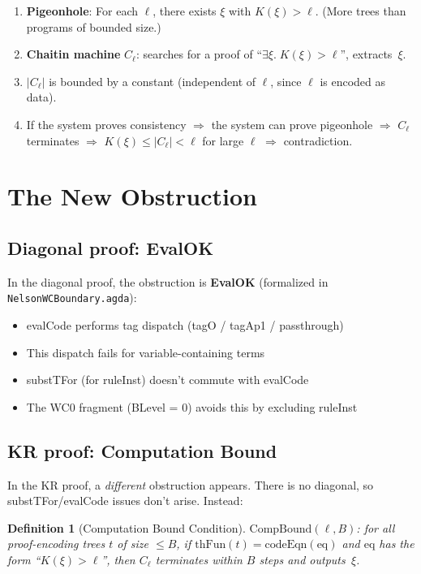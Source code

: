 \documentclass[11pt]{article}
\newtheorem{definition}[theorem]{Definition}
\begin{document}
\begin{enumerate}
\item \textbf{Pigeonhole}: For each $\ell$, there exists $\xi$ with $K(\xi) > \ell$.
  (More trees than programs of bounded size.)
\item \textbf{Chaitin machine} $C_\ell$: searches for a proof of ``$\exists \xi.\; K(\xi) > \ell$'', extracts~$\xi$.
\item $|C_\ell|$ is bounded by a constant (independent of $\ell$, since $\ell$ is encoded as data).
\item If the system proves consistency $\Rightarrow$ the system can prove pigeonhole $\Rightarrow$ $C_\ell$ terminates $\Rightarrow$ $K(\xi) \le |C_\ell| < \ell$ for large $\ell$ $\Rightarrow$ contradiction.
\end{enumerate}

\section{The New Obstruction}

\subsection{Diagonal proof: EvalOK}

In the diagonal proof, the obstruction is \textbf{EvalOK} (formalized in \texttt{NelsonWCBoundary.agda}):
\begin{itemize}
\item evalCode performs tag dispatch (tagO / tagAp1 / passthrough)
\item This dispatch fails for variable-containing terms
\item substTFor (for ruleInst) doesn't commute with evalCode
\item The WC0 fragment (BLevel = 0) avoids this by excluding ruleInst
\end{itemize}

\subsection{KR proof: Computation Bound}

In the KR proof, a \emph{different} obstruction appears. There is no diagonal, so substTFor/evalCode issues don't arise. Instead:

\begin{definition}[Computation Bound Condition]
$\mathrm{CompBound}(\ell, B)$: for all proof-encoding trees $t$ of size $\le B$, if $\mathrm{thFun}(t) = \mathrm{codeEqn}(\mathrm{eq})$ and $\mathrm{eq}$ has the form ``$K(\xi) > \ell$'', then $C_\ell$ terminates within $B$ steps and outputs~$\xi$.
\end{definition}
\end{document}
